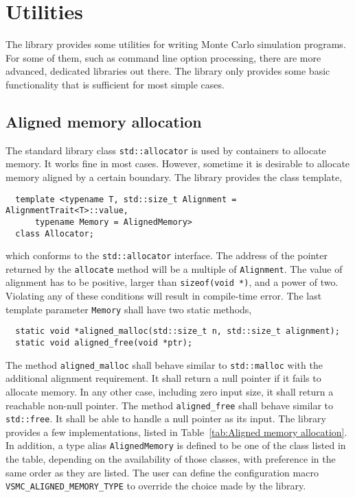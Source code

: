 \chapter{Utilities}
\label{chap:Utilities}

The library provides some utilities for writing Monte Carlo simulation
programs. For some of them, such as command line option processing, there are
more advanced, dedicated libraries out there. The library only provides some
basic functionality that is sufficient for most simple cases.

\section{Aligned memory allocation}
\label{sec:Aligned memory allocation}

The standard library class \verb|std::allocator| is used by containers to
allocate memory. It works fine in most cases. However, sometime it is desirable
to allocate memory aligned by a certain boundary. The library provides the
class template,
\begin{Verbatim}
  template <typename T, std::size_t Alignment = AlignmentTrait<T>::value,
      typename Memory = AlignedMemory>
  class Allocator;
\end{Verbatim}
which conforms to the \verb|std::allocator| interface. The address of the
pointer returned by the \verb|allocate| method will be a multiple of
\verb|Alignment|. The value of alignment has to be positive, larger than
\verb|sizeof(void *)|, and a power of two. Violating any of these conditions
will result in compile-time error. The last template parameter \verb|Memory|
shall have two static methods,
\begin{Verbatim}
  static void *aligned_malloc(std::size_t n, std::size_t alignment);
  static void aligned_free(void *ptr);
\end{Verbatim}
The method \verb|aligned_malloc| shall behave similar to \verb|std::malloc|
with the additional alignment requirement. It shall return a null pointer if it
fails to allocate memory. In any other case, including zero input size, it
shall return a reachable non-null pointer. The method \verb|aligned_free| shall
behave similar to \verb|std::free|. It shall be able to handle a null pointer
as its input. The library provides a few implementations, listed in
Table~\ref{tab:Aligned memory allocation}. In addition, a type alias
\verb|AlignedMemory| is defined to be one of the class listed in the table,
depending on the availability of those classes, with preference in the same
order as they are listed. The user can define the configuration macro
\verb|VSMC_ALIGNED_MEMORY_TYPE| to override the choice made by the library.

